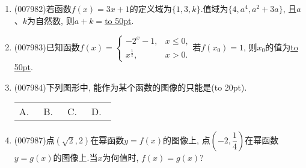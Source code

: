 \documentclass[10pt,a4paper]{article}
\newcommand{\blank}[1]{\underline{\hbox to #1pt{}}}
\newcommand{\bracket}[1]{(\hbox to #1pt{})}
\newcommand{\fourch}[4]{\par\begin{tabular}{p{.23\textwidth}p{.23\textwidth}p{.23\textwidth}p{.23\textwidth}}
A.~#1 &B.~#2& C.~#3& D.~#4
\end{tabular}}
\begin{document}
\begin{enumerate}[1.]
\item {\tiny (007982)}若函数$f(x)=3x+1$的定义域为$\{1,3,k\}$.值域为$\{4,a^4,a^2+3a\}$, 且$a$、$k$为自然数, 则$a+k=$\blank{50}.
\item {\tiny (007983)}已知函数$f(x)=\begin{cases} -2^x-1, & x\le 0, \\x^{\frac 12}, & x>0. \end{cases}$若$f(x_0)=1$, 则$x_0$的值为\blank{50}.
\item {\tiny (007984)}下列图形中, 能作为某个函数的图像的只能是\bracket{20}.
\fourch{\begin{tikzpicture}[>=latex]
    \draw [->] (-1.5,0) -- (1.5,0) node [below] {$x$};
    \draw [->] (0,-1.5) -- (0,1.5) node [left] {$y$};
    \draw (0,0) node [below left] {$O$};
    \draw (1,0) node [below right] {$1$} (-1,0) node [below left] {$-1$} (0,1) node [above left] {$1$} (0,-1) node [below left] {$-1$};
    \draw (0,0) circle (1);
\end{tikzpicture}
}{\begin{tikzpicture}[>=latex]
    \draw [->] (-1.5,0) -- (1.5,0) node [below] {$x$};
    \draw [->] (0,-1.5) -- (0,1.5) node [left] {$y$};
    \draw (0,0) node [below left] {$O$};
    \draw (1,0) node [below right] {$1$} (0,1) node [above left] {$1$} (0,-1) node [below left] {$-1$};
    \draw (0,1) arc (90:-90:1);
\end{tikzpicture}}{\begin{tikzpicture}[>=latex]
    \draw [->] (-1.5,0) -- (1.5,0) node [below] {$x$};
    \draw [->] (0,-1.5) -- (0,1.5) node [left] {$y$};
    \draw (0,0) node [below left] {$O$};
    \draw (1,0) node [below right] {$1$} (0,1) node [above left] {$1$} (0,-1) node [below left] {$-1$} (-1,0) node [below left] {$-1$};
    \draw (0,1) arc (90:0:1) (0,-1) arc (270:180:1);
    \filldraw [fill = white, draw = black] (0,1) circle (0.05) (0,-1) circle (0.05);
\end{tikzpicture}}{\begin{tikzpicture}[>=latex]
    \draw [->] (-1.5,0) -- (1.5,0) node [below] {$x$};
    \draw [->] (0,-1.5) -- (0,1.5) node [left] {$y$};
    \draw (0,0) node [below left] {$O$};
    \draw (1,0) node [below right] {$1$} (0,1) node [above left] {$1$} (0,-1) node [below left] {$-1$} (-1,0) node [below left] {$-1$};
    \draw (0,1) arc (90:180:1) (0,-1) arc (270:360:1);
    \filldraw (0,1) circle (0.05) (0,-1) circle (0.05) (1,0) circle (0.05) (-1,0) circle (0.05);
\end{tikzpicture}}
\item {\tiny (007987)}点$(\sqrt 2,2)$在幂函数$y=f(x)$的图像上, 点$(-2,\dfrac 14)$在幂函数$y=g(x)$的图像上.当$x$为何值时, $f(x)=g(x)$?

\end{enumerate}
\end{document}
